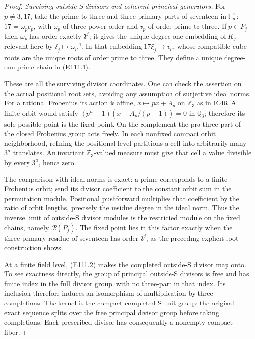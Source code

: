 \begin{proof}
\emph{Surviving outside-S divisors and coherent principal generators.}
For $p\ne3,17$, take the prime-to-three and three-primary
parts of seventeen in $\mathbb F_p^\times$:
$17=\omega_p v_p$, with $\omega_p$ of three-power order
and $v_p$ of order prime to three. If $p\in P_j$ then
$\omega_p$ has order exactly $3^j$; it gives the unique
degree-one embedding of $K_j$ relevant here by
$\xi_j\mapsto\omega_p^{-1}$. In that embedding
$17\xi_j\mapsto v_p$, whose compatible cube roots are
the unique roots of order prime to three. They define
a unique degree-one prime chain in (E111.1).

These are all the surviving divisor coordinates.
One can check the assertion on the actual positional
root sets, avoiding any assumption of surjective ideal
norms. For a rational Frobenius its action is affine,
$x\mapsto px+A_p$ on $\mathbb Z_3$ as in E.46.
A finite orbit would satisfy
$(p^n-1)(x+A_p/(p-1))=0$ in $\mathbb Q_3$;
therefore its sole possible point is the fixed point.
On the complement the pro-three part of the closed
Frobenius group acts freely. In each nonfixed compact
orbit neighborhood, refining the positional level
partitions a cell into arbitrarily many $3^a$ translates.
An invariant $\mathbb Z_3$-valued measure must give that
cell a value divisible by every $3^a$, hence zero.

The comparison with ideal norms is exact: a prime
corresponds to a finite Frobenius orbit; send its divisor
coefficient to the constant orbit sum in the permutation
module. Positional pushforward multiplies that
coefficient by the ratio of orbit lengths, precisely
the residue degree in the ideal norm. Thus the inverse
limit of outside-S divisor modules is the restricted
module on the fixed chains, namely $\mathcal R(P_j)$.
The fixed point lies in this factor exactly when the
three-primary residue of seventeen has order $3^j$,
as the preceding explicit root construction shows.

At a finite field level, (E111.2) makes the completed
outside-S divisor map onto. To see exactness directly,
the group of principal outside-S divisors is free and
has finite index in the full divisor group, with no
three-part in that index. Its inclusion therefore
induces an isomorphism of multiplication-by-three
completions. The kernel is the compact completed
S-unit group: the original exact sequence splits
over the free principal divisor group before taking
completions. Each prescribed divisor has consequently
a nonempty compact fiber.


\end{proof}
